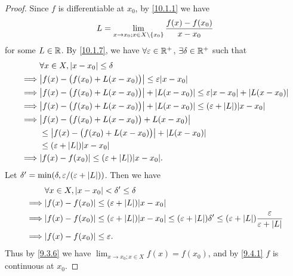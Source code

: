\begin{proof}
  Since \(f\) is differentiable at \(x_0\), by \cref{10.1.1} we have
  \[
    L = \lim_{x \to x_0 ; x \in X \setminus \left\lbrace x_0\right\rbrace} \dfrac{f(x) - f(x_0)}{x - x_0}
  \]
  for some \(L \in \mathbb{R}\).
  By \cref{10.1.7}, we have \(\forall \varepsilon \in \mathbb{R}^+\), \(\exists \delta \in \mathbb{R}^+\) such that
  \begin{align*}
             & \forall x \in X, \abs{x - x_0} \leq \delta                                                                      \\
    \implies & \abs{f(x) - \big(f(x_0) + L(x - x_0)\big)} \leq \varepsilon \abs{x - x_0}                                       \\
    \implies & \abs{f(x) - \big(f(x_0) + L(x - x_0)\big)} + \abs{L(x - x_0)} \leq \varepsilon \abs{x - x_0} + \abs{L(x - x_0)} \\
    \implies & \abs{f(x) - \big(f(x_0) + L(x - x_0)\big)} + \abs{L(x - x_0)} \leq (\varepsilon + \abs{L}) \abs{x - x_0}        \\
    \implies & \abs{f(x) - \big(f(x_0) + L(x - x_0)\big) + L(x - x_0)}                                                         \\
             & \leq \abs{f(x) - \big(f(x_0) + L(x - x_0)\big)} + \abs{L(x - x_0)}                                              \\
             & \leq (\varepsilon + \abs{L}) \abs{x - x_0}                                                                      \\
    \implies & \abs{f(x) - f(x_0)} \leq (\varepsilon + \abs{L}) \abs{x - x_0}.
  \end{align*}
  Let \(\delta' = \min(\delta, \varepsilon / (\varepsilon + \left\lvert L\right\rvert))\).
  Then we have
  \begin{align*}
             & \forall x \in X, \abs{x - x_0} < \delta' \leq \delta                                                                                                                        \\
    \implies & \abs{f(x) - f(x_0)} \leq (\varepsilon + \abs{L}) \abs{x - x_0}                                                                                                              \\
    \implies & \abs{f(x) - f(x_0)} \leq (\varepsilon + \abs{L}) \abs{x - x_0} \leq (\varepsilon + \abs{L}) \delta' \leq (\varepsilon + \abs{L}) \dfrac{\varepsilon}{\varepsilon + \abs{L}} \\
    \implies & \abs{f(x) - f(x_0)} \leq \varepsilon.
  \end{align*}
  Thus by \cref{9.3.6} we have \(\lim_{x \to x_0 ; x \in X} f(x) = f(x_0)\), and by \cref{9.4.1} \(f\) is continuous at \(x_0\).
\end{proof}

